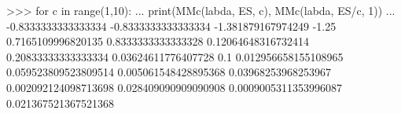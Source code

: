 
>>> for c in range(1,10):
...     print(MMc(labda, ES, c), MMc(labda, ES/c, 1))
...
-0.8333333333333334 -0.8333333333333334
-1.381879167974249 -1.25
0.7165109996820135 0.8333333333333328
0.12064648316732414 0.20833333333333334
0.03624611776407728 0.1
0.012956658155108965 0.059523809523809514
0.005061548428895368 0.03968253968253967
0.002092124098713698 0.028409090909090908
0.0009005311353996087 0.021367521367521368

